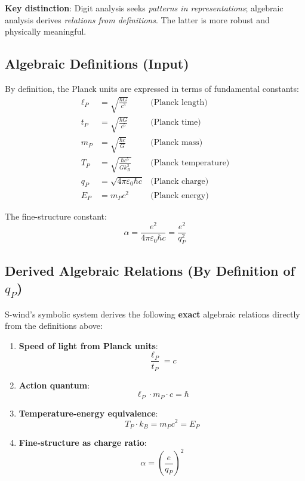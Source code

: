 \documentclass[twocolumn,showpacs,preprintnumbers,amsmath,amssymb,prl]{revtex4-2}
\begin{document}
\textbf{Key distinction}: Digit analysis seeks \textit{patterns in representations}; algebraic analysis derives \textit{relations from definitions}. The latter is more robust and physically meaningful.

\subsection{Algebraic Definitions (Input)}

By definition, the Planck units are expressed in terms of fundamental constants:
\begin{align}
    \ell_P &= \sqrt{\frac{\hbar G}{c^3}} & \text{(Planck length)} \\
    t_P &= \sqrt{\frac{\hbar G}{c^5}} & \text{(Planck time)} \\
    m_P &= \sqrt{\frac{\hbar c}{G}} & \text{(Planck mass)} \\
    T_P &= \sqrt{\frac{\hbar c^5}{G k_B^2}} & \text{(Planck temperature)} \\
    q_P &= \sqrt{4\pi\varepsilon_0 \hbar c} & \text{(Planck charge)} \\
    E_P &= m_P c^2 & \text{(Planck energy)}
\end{align}

The fine-structure constant:
\begin{equation}
    \alpha = \frac{e^2}{4\pi\varepsilon_0 \hbar c} = \frac{e^2}{q_P^2}
\end{equation}

\subsection{Derived Algebraic Relations (By Definition of $q_P$)}

S-wind's symbolic system derives the following \textbf{exact} algebraic relations directly from the definitions above:

\begin{enumerate}
    \item \textbf{Speed of light from Planck units}:
    \begin{equation}
        \boxed{\frac{\ell_P}{t_P} = c}
    \end{equation}
    
    \item \textbf{Action quantum}:
    \begin{equation}
        \boxed{\ell_P \cdot m_P \cdot c = \hbar}
    \end{equation}
    
    \item \textbf{Temperature-energy equivalence}:
    \begin{equation}
        \boxed{T_P \cdot k_B = m_P c^2 = E_P}
    \end{equation}
    
    \item \textbf{Fine-structure as charge ratio}:
    \begin{equation}
        \boxed{\alpha = \left(\frac{e}{q_P}\right)^2}
    \end{equation}
\end{enumerate}
\end{document}
